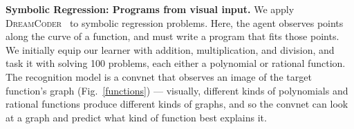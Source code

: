 \documentclass{article}
\newcommand{\system}{\textsc{DreamCoder}~}
\newcommand{\probability}{\mathds{P}} %
\begin{document}
\textbf{Symbolic Regression: Programs from visual input.}
We apply \system
to symbolic regression problems.  Here, the
agent observes points along the curve of a function, and must write a
program that fits those points.  We initially equip our learner with
addition, multiplication, and division, and task it with solving
100 %
problems, each either a polynomial or rational function.  The recognition model is a
convnet that observes an image of the target function's
graph (Fig.~\ref{functions}) --- visually, different kinds of
polynomials and rational functions produce different kinds of graphs,
and so the convnet can  look at a graph and predict
what kind of function best explains it.
\end{document}
